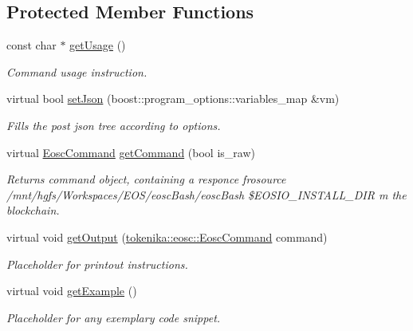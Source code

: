 \subsection*{Protected Member Functions}
\begin{DoxyCompactItemize}
\item 
const char $\ast$ \hyperlink{classtokenika_1_1eosc_1_1_get_info_options_aad995529f121f42cdd8f0b1380540370}{get\+Usage} ()
\begin{DoxyCompactList}\small\item\em Command \textquotesingle{}usage\textquotesingle{} instruction. \end{DoxyCompactList}\item 
virtual bool \hyperlink{classtokenika_1_1eosc_1_1_get_info_options_a15688c1262b3d861bd7de015e92dd6a7}{set\+Json} (boost\+::program\+\_\+options\+::variables\+\_\+map \&vm)
\begin{DoxyCompactList}\small\item\em Fills the post json tree according to options. \end{DoxyCompactList}\item 
virtual \hyperlink{classtokenika_1_1eosc_1_1_eosc_command}{Eosc\+Command} \hyperlink{classtokenika_1_1eosc_1_1_get_info_options_a7283bdc9a328ccd8a29a25bcdc01dfa6}{get\+Command} (bool is\+\_\+raw)
\begin{DoxyCompactList}\small\item\em Returns command object, containing a responce frosource /mnt/hgfs/\+Workspaces/\+E\+O\+S/eosc\+Bash/eosc\+Bash \$\+E\+O\+S\+I\+O\+\_\+\+I\+N\+S\+T\+A\+L\+L\+\_\+\+D\+IR m the blockchain. \end{DoxyCompactList}\item 
virtual void \hyperlink{classtokenika_1_1eosc_1_1_get_info_options_a73ebf397cd94b45513f1e049cbbb0eb5}{get\+Output} (\hyperlink{classtokenika_1_1eosc_1_1_eosc_command}{tokenika\+::eosc\+::\+Eosc\+Command} command)
\begin{DoxyCompactList}\small\item\em Placeholder for printout instructions. \end{DoxyCompactList}\item 
virtual void \hyperlink{classtokenika_1_1eosc_1_1_get_info_options_a652a64ac80195f98b33ae91a2b284316}{get\+Example} ()
\begin{DoxyCompactList}\small\item\em Placeholder for any exemplary code snippet. \end{DoxyCompactList}\end{DoxyCompactItemize}
